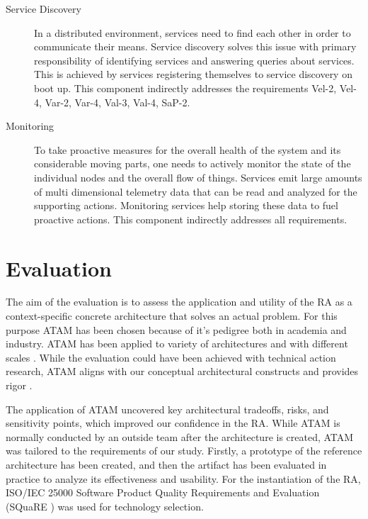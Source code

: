 \documentclass[a4paper,11pt]{article}
\let\cite\citep
\begin{document}
\begin{description}
    \item[Service Discovery] In a distributed environment, services need to find each other in order to communicate their means. Service discovery solves this issue with primary responsibility of identifying services and answering queries about services. This is achieved by services registering themselves to service discovery on boot up. This component indirectly addresses the requirements Vel-2, Vel-4, Var-2, Var-4, Val-3, Val-4, SaP-2. 

    \item[Monitoring] To take proactive measures for the overall health of the system and its considerable moving parts, one needs to actively monitor the state of the individual nodes and the overall flow of things. Services emit large amounts of multi dimensional telemetry data that can be read and analyzed for the supporting actions. Monitoring services help storing these data to fuel proactive actions. This component indirectly addresses all requirements. 

\end{description}


\section{Evaluation}

The aim of the evaluation is to assess the application and utility of the RA as a context-specific concrete architecture that solves an actual problem. For this purpose ATAM has been chosen because of it's pedigree both in academia and industry. ATAM has been applied to variety of architectures and with different scales \cite{SoftwareArchitectureKazman}. While the evaluation could have been achieved with technical action research,  ATAM aligns with our conceptual architectural constructs and provides rigor \cite{wieringa2014design}.

The application of ATAM uncovered key architectural tradeoffs, risks, and sensitivity points, which improved our confidence in the RA. While ATAM is normally conducted by an outside team after the architecture is created, ATAM was tailored to the requirements of our study. Firstly, a prototype of the reference architecture has been created, and then the artifact has been evaluated in practice to analyze its effectiveness and usability. For the instantiation of the RA, ISO/IEC 25000 Software Product Quality Requirements and Evaluation (SQuaRE ) \cite{ISO25000} was used for technology selection. 
\end{document}
